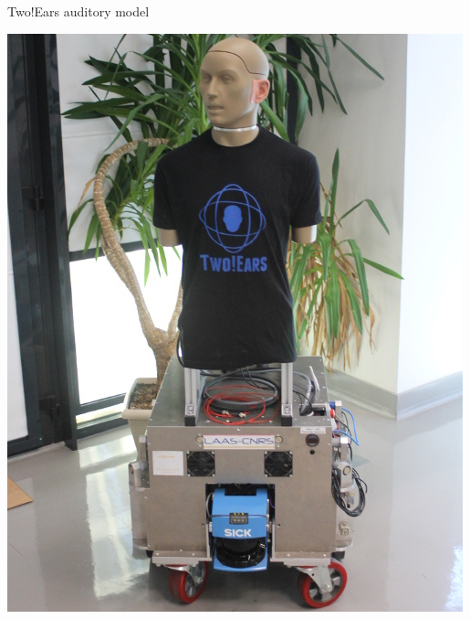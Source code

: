 \documentclass{beamer}
\begin{document}
\begin{frame}{Two!Ears auditory model}
\begin{minipage}[b]{0.56\columnwidth}
        \centering
        \includegraphics[width=.575\textwidth]{fig/robot}

    \end{minipage}

\end{frame}
\end{document}
